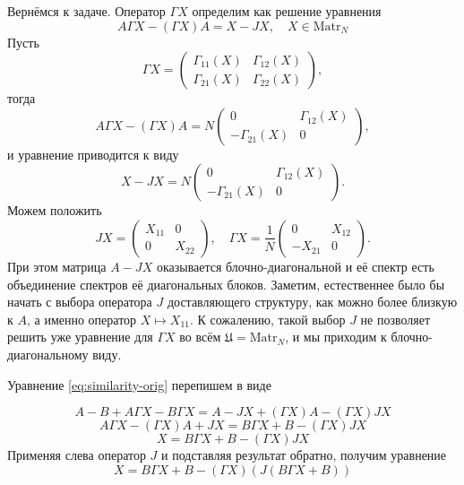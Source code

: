 Вернёмся к задаче.
Оператор \( \Gamma X \) определим как решение уравнения\footnotemark
\[
    A\Gamma X - (\Gamma X) A = X - JX,\quad X\in\mathrm{Matr}_{N}
    \]%
%
Пусть
\[ \Gamma X =
\begin{pmatrix}
    \Gamma_{11}(X) & \Gamma_{12}(X) \\
    \Gamma_{21}(X) & \Gamma_{22}(X)
\end{pmatrix}, \]
тогда
\[
    A \Gamma X - (\Gamma X) A =
    N
    \begin{pmatrix}
        0               & \Gamma_{12}(X) \\
        -\Gamma_{21}(X) & 0
    \end{pmatrix},
\]
и уравнение приводится к виду
\[
    X - JX =
    N
    \begin{pmatrix}
        0               & \Gamma_{12}(X) \\
        -\Gamma_{21}(X) & 0
    \end{pmatrix}.
\]
Можем положить
\[
    JX = \begin{pmatrix}
        X_{11} & 0 \\
        0      & X_{22}
    \end{pmatrix},\quad
    \Gamma X =
    \frac1N
    \begin{pmatrix}
        0       & X_{12} \\
        -X_{21} & 0
    \end{pmatrix}.
    \]
При этом матрица \( A - JX \) оказывается блочно-диагональной
и её спектр есть объединение спектров её диагональных блоков.
Заметим, естественнее было бы начать с выбора оператора \( J \) доставляющего структуру,
как можно более близкую к \( A \), а именно
оператор \( X\mapsto X_{11} \).
К сожалению, такой выбор \( J \) не позволяет решить
уже уравнение для \(\Gamma X\) во всём \(\mathfrak U = \mathrm{Matr}_{N}\),
и мы приходим к блочно-диагональному виду.

Уравнение \eqref{eq:similarity-orig} перепишем в виде

\[
    A - B + A\Gamma X - B\Gamma X = A - JX + (\Gamma X) A - (\Gamma X) JX
    \]
\[
    A\Gamma X - (\Gamma X) A + JX = B \Gamma X + B - (\Gamma X) JX
    \]
\[
    X = B \Gamma X + B - (\Gamma X) JX
    \]
Применяя слева оператор \( J \) и подставляя результат обратно, получим уравнение
\begin{equation}\label{eq:similarity2}
    X = B \Gamma X + B - (\Gamma X) (J(B\Gamma X + B))
\end{equation}

